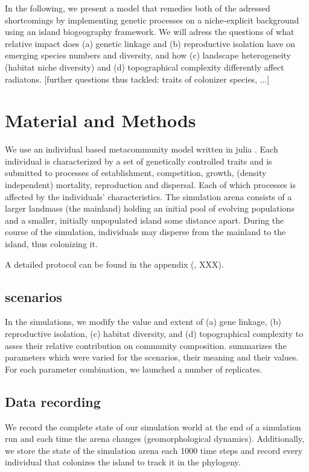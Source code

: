 \documentclass[a4paper]{scrartcl}
\begin{document}
In the following, we present a model that remedies both of the adressed shortcomings by implementing genetic processes on a niche-explicit background
using an island biogeography framework.
We will adress the questions of what relative impact does (a) genetic linkage and (b) reproductive isolation have on emerging species numbers and diversity,
and how (c) landscape heterogeneity (habitat niche diversity) and (d) topographical complexity differently affect radiatons.
[further questions thus tackled: traits of colonizer species, ...]




\section{Material and Methods}
We use an individual based metacommunity model written in julia \cite{JULIALANG}.
Each individual is characterized by a set of genetically controlled traits and is submitted to processes of
establishment, competition, growth, (density independent) mortality, reproduction and dispersal.
Each of which processes is affected by the individuals' characteristics.
The simulation arena consists of a larger landmass (the mainland) holding an initial pool of evolving populations and a smaller, initially unpopulated island some distance apart.
During the course of the simulation, individuals may disperse from the mainland to the island, thus colonizing it.

A detailed protocol can be found in the appendix (\cite{grimm2010odd}, XXX).

\subsection{scenarios}
In the simulations, we modify the value and extent of
(a) gene linkage,
(b) reproductive isolation,
(c) habitat diversity, and
(d) topographical complexity
to asses their relative contribution on community composition.
 summarizes the parameters which were varied for the scenarios, their meaning and their values. %
For each parameter combination, we launched a number of %
replicates.

\subsection{Data recording}
We record the complete state of our simulation world at the end of a simulation run and each time the arena changes (geomorphological dynamics).
Additionally, we store the state of the simulation arena each 1000 %
time steps and record every individual that colonizes the island to track it in the phylogeny.
\end{document}
